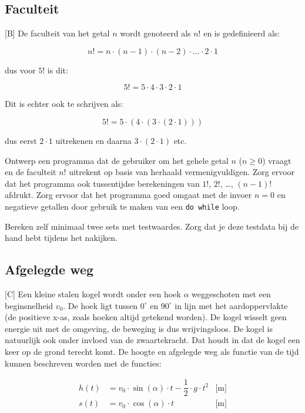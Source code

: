 \documentclass[a4paper,10pt,fleqn,twoside]{article}
\begin{document}
\subsection{Faculteit}[B]
De faculteit van het getal $n$ wordt genoteerd als $n!$ en is gedefinieerd als:

\begin{equation*}
n! = n\cdot (n-1)\cdot (n-2)\cdot\ldots\cdot2\cdot1
\end{equation*}

dus voor $5!$ is dit:

\begin{equation*}
5! = 5\cdot4\cdot3\cdot2\cdot1
\end{equation*}

Dit is echter ook te schrijven als:

\begin{equation*}
5! = 5\cdot(4\cdot(3\cdot(2\cdot1)))
\end{equation*}

dus eerst $2\cdot1$ uitrekenen en daarna $3\cdot(2\cdot1)$ etc.

Ontwerp een programma dat de gebruiker om het gehele getal $n$ ($n \geq 0$) vraagt en de faculteit $n!$ uitrekent op basis van herhaald vermenigvuldigen. Zorg ervoor dat het programma ook tussentijdse berekeningen van $1!$, $2!$, \ldots, $(n-1)!$ afdrukt. Zorg ervoor dat het programma goed omgaat met de invoer $n = 0$ en negatieve getallen door gebruik te maken van een \lstinline|do while| loop.

Bereken zelf minimaal twee sets met testwaardes. Zorg dat je deze testdata bij de hand hebt tijdens het nakijken.

\subsection{Afgelegde weg}[C]
Een kleine stalen kogel wordt onder een hoek $\alpha$ weggeschoten met een beginsnelheid $v_0$. De hoek ligt tussen $0^\circ$ en $90^\circ$ in lijn met het aardoppervlakte (de positieve x-as, zoals hoeken altijd getekend worden). De kogel wisselt geen energie uit met de omgeving, de beweging is dus wrijvingsloos. De kogel is natuurlijk ook onder invloed van de zwaartekracht. Dat houdt in dat de kogel een keer op de grond terecht komt. De hoogte en afgelegde weg als functie van de tijd kunnen beschreven worden met de functies:

\begin{align*}
h(t) &= v_0\cdot \sin(\alpha)\cdot t - \dfrac{1}{2}\cdot g\cdot t^2 & \text{[m]} \\
s(t) &= v_0\cdot \cos(\alpha)\cdot t & \text{[m]} 
\end{align*}
\end{document}
